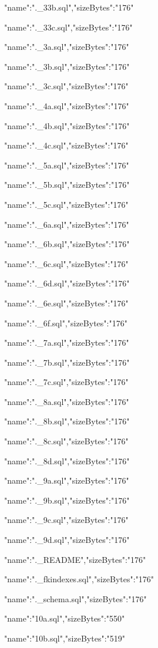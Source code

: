 \documentclass[11pt,a4paper]{article}
\begin{document}
{"name":".\_33b.sql","sizeBytes":"176"}

{"name":".\_33c.sql","sizeBytes":"176"}

{"name":".\_3a.sql","sizeBytes":"176"}

{"name":".\_3b.sql","sizeBytes":"176"}

{"name":".\_3c.sql","sizeBytes":"176"}

{"name":".\_4a.sql","sizeBytes":"176"}

{"name":".\_4b.sql","sizeBytes":"176"}

{"name":".\_4c.sql","sizeBytes":"176"}

{"name":".\_5a.sql","sizeBytes":"176"}

{"name":".\_5b.sql","sizeBytes":"176"}

{"name":".\_5c.sql","sizeBytes":"176"}

{"name":".\_6a.sql","sizeBytes":"176"}

{"name":".\_6b.sql","sizeBytes":"176"}

{"name":".\_6c.sql","sizeBytes":"176"}

{"name":".\_6d.sql","sizeBytes":"176"}

{"name":".\_6e.sql","sizeBytes":"176"}

{"name":".\_6f.sql","sizeBytes":"176"}

{"name":".\_7a.sql","sizeBytes":"176"}

{"name":".\_7b.sql","sizeBytes":"176"}

{"name":".\_7c.sql","sizeBytes":"176"}

{"name":".\_8a.sql","sizeBytes":"176"}

{"name":".\_8b.sql","sizeBytes":"176"}

{"name":".\_8c.sql","sizeBytes":"176"}

{"name":".\_8d.sql","sizeBytes":"176"}

{"name":".\_9a.sql","sizeBytes":"176"}

{"name":".\_9b.sql","sizeBytes":"176"}

{"name":".\_9c.sql","sizeBytes":"176"}

{"name":".\_9d.sql","sizeBytes":"176"}

{"name":".\_README","sizeBytes":"176"}

{"name":".\_fkindexes.sql","sizeBytes":"176"}

{"name":".\_schema.sql","sizeBytes":"176"}

{"name":"10a.sql","sizeBytes":"550"}

{"name":"10b.sql","sizeBytes":"519"}
\end{document}

